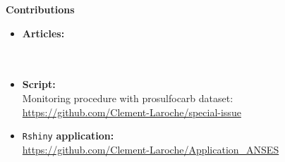 {\Large\textbf{Contributions}}
\begin{itemize}
\item \textbf{Articles:} \\ 
 \\
 \\
\item \textbf{Script:} \\
Monitoring procedure with prosulfocarb dataset: \url{https://github.com/Clement-Laroche/special-issue}
\item \texttt{Rshiny} \textbf{application:} \\
\url{https://github.com/Clement-Laroche/Application_ANSES}
\end{itemize}
